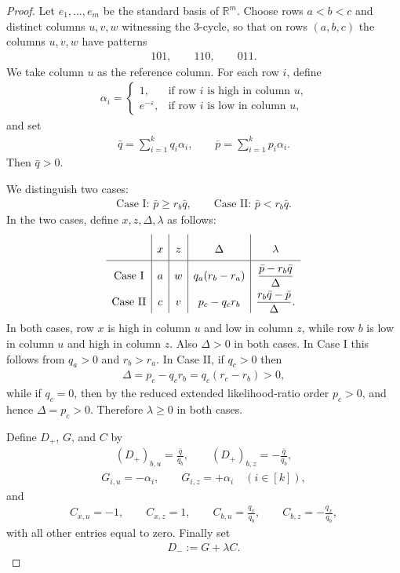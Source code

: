 \documentclass[10pt,a4paper]{amsart}
\begin{document}
\begin{proof}
Let $e_1,\dots,e_m$ be the standard basis of $\mathbb{R}^m$. Choose rows $a<b<c$ and distinct columns $u,v,w$ witnessing the $3$-cycle, so that on rows $(a,b,c)$ the columns $u,v,w$ have patterns
\begin{align*}
    101,\qquad 110,\qquad 011.
\end{align*}
We take column $u$ as the reference column. For each row $i$, define
\begin{align*}
    \alpha_i=
    \begin{cases}
        1, & \text{if row $i$ is high in column $u$,}\\
        e^{-\varepsilon}, & \text{if row $i$ is low in column $u$,}
    \end{cases}
\end{align*}
and set
\begin{align*}
    \bar q=\sum_{i=1}^k q_i\alpha_i,\qquad
    \bar p=\sum_{i=1}^k p_i\alpha_i.
\end{align*}
Then $\bar q>0$.

We distinguish two cases:
\begin{align*}
    \text{Case I: }\bar p\ge r_b\bar q,
    \qquad
    \text{Case II: }\bar p<r_b\bar q.
\end{align*}
In the two cases, define $x,z,\Delta,\lambda$ as follows:
\begin{align*}
    \renewcommand{\arraystretch}{2.0}
    \begin{array}{c|c|c|c|c}
         & x & z & \Delta & \lambda \\ \hline
        \text{Case I} & a & w & q_a(r_b-r_a) &
        \dfrac{\bar p-r_b\bar q}{\Delta} \\
        \text{Case II} & c & v & p_c-q_c r_b &
        \dfrac{r_b\bar q-\bar p}{\Delta}.
    \end{array}
\end{align*}
In both cases, row $x$ is high in column $u$ and low in column $z$, while row $b$ is low in column $u$ and high in column $z$. Also $\Delta>0$ in both cases. In Case I this follows from $q_a>0$ and $r_b>r_a$. In Case II, if $q_c>0$ then
\begin{align*}
    \Delta=p_c-q_c r_b=q_c(r_c-r_b)>0,
\end{align*}
while if $q_c=0$, then by the reduced extended likelihood-ratio order $p_c>0$, and hence $\Delta=p_c>0$. Therefore $\lambda\ge 0$ in both cases.

Define $D_+$, $G$, and $C$ by
\begin{align*}
    (D_+)_{b,u}=\frac{\bar q}{q_b},
    \qquad
    (D_+)_{b,z}=-\frac{\bar q}{q_b},
\end{align*}
\begin{align*}
    G_{i,u}=-\alpha_i,\qquad G_{i,z}=+\alpha_i \quad (i\in[k]),
\end{align*}
and
\begin{align*}
    C_{x,u}=-1,\qquad C_{x,z}=1,\qquad
    C_{b,u}=\frac{q_x}{q_b},\qquad C_{b,z}=-\frac{q_x}{q_b},
\end{align*}
with all other entries equal to zero. Finally set
\begin{align*}
    D_-:=G+\lambda C.
\end{align*}


\end{proof}
\end{document}

